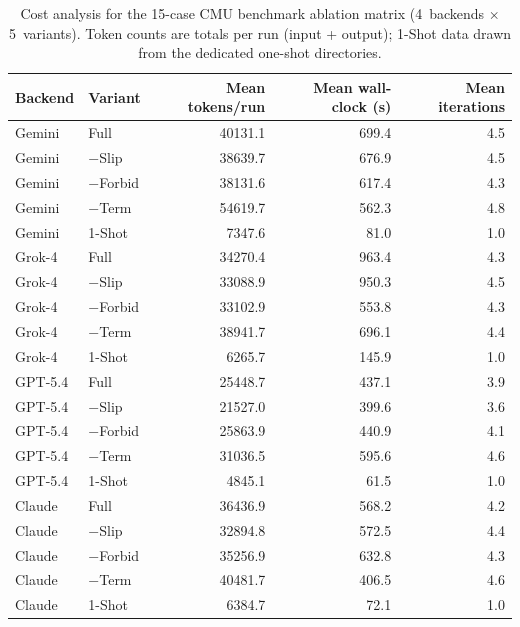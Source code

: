 \begin{table}[h]
\centering
\caption{Cost analysis for the 15-case CMU benchmark ablation matrix (4~backends $\times$ 5~variants). Token counts are totals per run (input + output); 1-Shot data drawn from the dedicated one-shot directories.}
\label{tab:si6-cost-analysis}
\begin{tabular}{llrrr}
\toprule
Backend & Variant & Mean tokens/run & Mean wall-clock (s) & Mean iterations \\
\midrule
Gemini & Full & 40131.1 & 699.4 & 4.5 \\
Gemini & $-$Slip & 38639.7 & 676.9 & 4.5 \\
Gemini & $-$Forbid & 38131.6 & 617.4 & 4.3 \\
Gemini & $-$Term & 54619.7 & 562.3 & 4.8 \\
Gemini & 1-Shot & 7347.6 & 81.0 & 1.0 \\
Grok-4 & Full & 34270.4 & 963.4 & 4.3 \\
Grok-4 & $-$Slip & 33088.9 & 950.3 & 4.5 \\
Grok-4 & $-$Forbid & 33102.9 & 553.8 & 4.3 \\
Grok-4 & $-$Term & 38941.7 & 696.1 & 4.4 \\
Grok-4 & 1-Shot & 6265.7 & 145.9 & 1.0 \\
GPT-5.4 & Full & 25448.7 & 437.1 & 3.9 \\
GPT-5.4 & $-$Slip & 21527.0 & 399.6 & 3.6 \\
GPT-5.4 & $-$Forbid & 25863.9 & 440.9 & 4.1 \\
GPT-5.4 & $-$Term & 31036.5 & 595.6 & 4.6 \\
GPT-5.4 & 1-Shot & 4845.1 & 61.5 & 1.0 \\
Claude & Full & 36436.9 & 568.2 & 4.2 \\
Claude & $-$Slip & 32894.8 & 572.5 & 4.4 \\
Claude & $-$Forbid & 35256.9 & 632.8 & 4.3 \\
Claude & $-$Term & 40481.7 & 406.5 & 4.6 \\
Claude & 1-Shot & 6384.7 & 72.1 & 1.0 \\
\bottomrule
\end{tabular}
\end{table}
